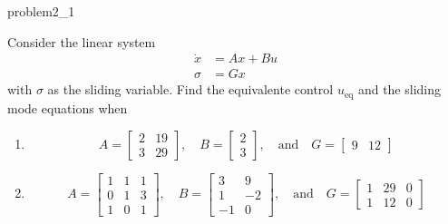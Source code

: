 \begin{problem}{2.1}{problem2_1}

Consider the linear system
\[
	\begin{aligned}
		\dot{x} & = Ax + Bu \\
		\sigma  & = Gx
	\end{aligned}
\]
with $\sigma$ as the sliding variable. Find the equivalente control $u_{\text{eq}}$ and the sliding mode equations when
\begin{enumerate}
	\item
	      \[
		      A = \begin{bmatrix}
			      2 & 19 \\
			      3 & 29
		      \end{bmatrix}, \quad B = \begin{bmatrix}
			      2 \\
			      3
		      \end{bmatrix}, \quad \text{and} \quad G = \begin{bmatrix}
			      9 & 12
		      \end{bmatrix}
	      \]
	\item
	      \[
		      A = \begin{bmatrix}
			      1 & 1 & 1 \\
			      0 & 1 & 3 \\
			      1 & 0 & 1
		      \end{bmatrix}, \quad B = \begin{bmatrix}
			      3  & 9  \\
			      1  & -2 \\
			      -1 & 0
		      \end{bmatrix}, \quad \text{and} \quad G = \begin{bmatrix}
			      1 & 29 & 0 \\
			      1 & 12 & 0
		      \end{bmatrix}
	      \]
\end{enumerate}

\end{problem}

